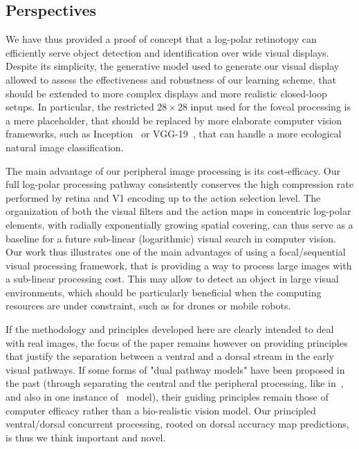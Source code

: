 \subsection{Perspectives}

We have thus provided a proof of concept that a log-polar retinotopy can efficiently serve object detection and identification over wide visual displays. Despite its simplicity, the generative model used to generate our visual display allowed to assess the effectiveness and robustness of our learning scheme, that should be extended to more complex displays and more realistic closed-loop setups. In particular, the restricted $28\times28$ input used for the foveal processing is a mere placeholder, that should be replaced by more elaborate computer vision frameworks, such as Inception~\cite{szegedy2015going} or VGG-19~\cite{simonyan2014very}, that can handle a more ecological natural image classification.

The main advantage of our peripheral image processing is its cost-efficacy. Our full log-polar processing pathway consistently conserves the high compression rate performed by retina and V1 encoding up to the action selection level. The organization of both the visual filters and the action maps in concentric log-polar elements, with radially exponentially growing spatial covering, can thus serve as a baseline for a future sub-linear (logarithmic) visual search in computer vision. Our work thus illustrates one of the main advantages of using a focal/sequential visual processing framework, that is providing a way to process large images with a sub-linear processing cost.
This may allow to detect an object in large visual environments, which should be particularly beneficial when the computing resources are under constraint, such as for drones or mobile robots.

If the methodology and principles developed here are clearly intended to deal with real images, the focus of the paper remains however on providing principles that justify the separation between a ventral and a dorsal stream in the early visual pathways. If some forms of "dual pathway models" have been proposed in the past (through separating the central and the peripheral processing, like in~\cite{denil2012learning}, and also in one instance of~\cite{akbas2017object} model), their guiding principles remain those of computer efficacy rather than a bio-realistic vision model. Our principled ventral/dorsal concurrent processing, rooted on dorsal accuracy map predictions, is thus we think important and novel.

